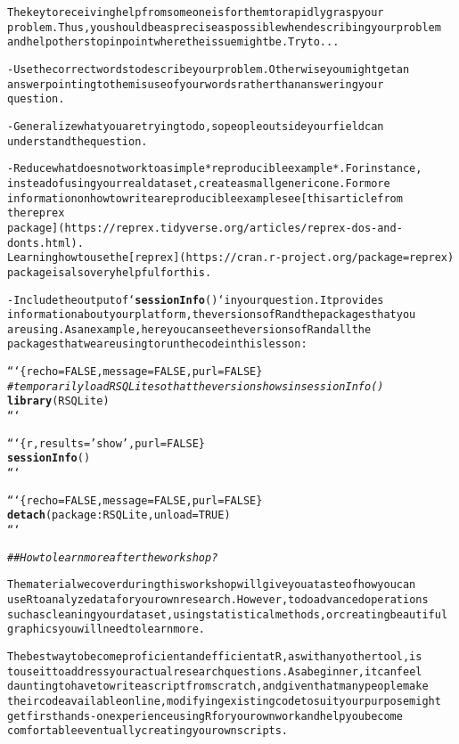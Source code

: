 \documentclass{article}\usepackage[]{graphicx}\usepackage[]{xcolor}
\makeatletter
\newcommand{\hlstr}[1]{\textcolor[rgb]{0.192,0.494,0.8}{#1}}%
\newcommand{\hlcom}[1]{\textcolor[rgb]{0.678,0.584,0.686}{\textit{#1}}}%
\newcommand{\hlkwd}[1]{\textcolor[rgb]{0.737,0.353,0.396}{\textbf{#1}}}%
\newenvironment{kframe}{%
 \def\at@end@of@kframe{}%
 \ifinner\ifhmode%
  \def\at@end@of@kframe{\end{minipage}}%
  \begin{minipage}{\columnwidth}%
 \fi\fi%
 \def\FrameCommand##1{\hskip\@totalleftmargin \hskip-\fboxsep
 \colorbox{shadecolor}{##1}\hskip-\fboxsep
     \hskip-\linewidth \hskip-\@totalleftmargin \hskip\columnwidth}%
 \MakeFramed {\advance\hsize-\width
   \@totalleftmargin\z@ \linewidth\hsize
   \@setminipage}}%
 {\par\unskip\endMakeFramed%
 \at@end@of@kframe}
\newenvironment{knitrout}{}{} %
\makeatother
\begin{document}
\begin{knitrout}
\begin{kframe}
\begin{alltt}
The key to receiving help from someone is for them to rapidly grasp your
problem. Thus, you should be as precise as possible when describing your problem
and help others to pinpoint where the issue might be. Try to...

-   Use the correct words to describe your problem. Otherwise you might get an
    answer pointing to the misuse of your words rather than answering your
    question.

-   Generalize what you are trying to do, so people outside your field can
    understand the question.

-   Reduce what does not work to a simple *reproducible example*. For instance,
    instead of using your real data set, create a small generic one. For more
    information on how to write a reproducible example see [this article from
    the reprex
    package](https://reprex.tidyverse.org/articles/reprex-dos-and-donts.html).
    Learning how to use the [reprex](https://cran.r-project.org/package=reprex)
    package is also very helpful for this.

-   Include the output of `\hlkwd{sessionInfo}()` in your question. It provides
    information about your platform, the versions of R and the packages that you
    are using. As an example, here you can see the versions of R and all the
    packages that we are using to run the code in this lesson:

```\{r echo=FALSE, message = FALSE, purl=FALSE\}
\hlcom{# temporarily load RSQLite so that the version shows in sessionInfo()}
\hlkwd{library}(RSQLite)
```

```\{r, results=\hlstr{'show'}, purl=FALSE\}
\hlkwd{sessionInfo}()
```

```\{r echo=FALSE, message = FALSE, purl=FALSE\}
\hlkwd{detach}(package:RSQLite, unload=TRUE)
```

\hlcom{## How to learn more after the workshop?}

The material we cover during this workshop will give you a taste of how you can
use R to analyze data for your own research. However, to do advanced operations
such as cleaning your dataset, using statistical methods, or creating beautiful
graphics you will need to learn more.

The best way to become proficient and efficient at R, as with any other tool, is
to use it to address your actual research questions. As a beginner, it can feel
daunting to have to write a script from scratch, and given that many people make
their code available online, modifying existing code to suit your purpose might
get first hands-on experience using R for your own work and help you become
comfortable eventually creating your own scripts.


\end{alltt}
\end{kframe}
\end{knitrout}
\end{document}
